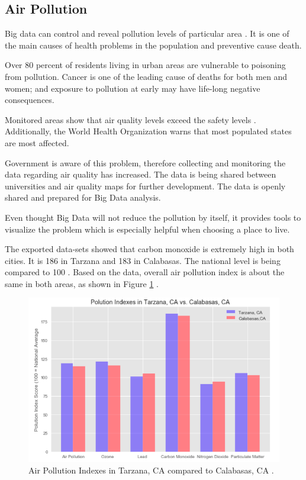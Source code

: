\documentclass[sigconf]{acmart}
\begin{document}
\subsection{Air Pollution}

Big data can control and reveal pollution levels of particular area \cite{pollution}. It is one of the main causes of health problems in the population and preventive cause death.

Over 80 percent of residents living in urban areas are vulnerable to poisoning from pollution.  Cancer is one of the leading cause of deaths for both men and women; and exposure to pollution at early may have life-long negative consequences.  

Monitored areas show that air quality levels exceed the safety levels \cite{pollution2}. Additionally, the World Health Organization warns that most populated states are most affected.

Government is aware of this problem, therefore collecting and monitoring the data regarding air quality has increased. The data is being shared between universities and air quality maps for further development. The data is openly shared and prepared for Big Data analysis.

Even thought Big Data will not reduce the pollution by itself, it provides tools to visualize the problem which is especially helpful when choosing a place to live.

The exported data-sets showed \cite{md} that carbon monoxide is extremely high in both cities. It is 186 in Tarzana and 183 in Calabasas. The national level is being compared to 100 \cite{clr}. Based on the data, overall air pollution index is about the same in both areas, as shown in Figure \ref{fig:figure4} \cite{md}.

\begin{figure}
  \centering
  \includegraphics[width=1.0\columnwidth]{images/figure4.png}
  \caption{Air Pollution Indexes in Tarzana, CA compared to Calabasas, CA \cite{md}.} \label{fig:figure4} 
\end{figure}
\end{document}
